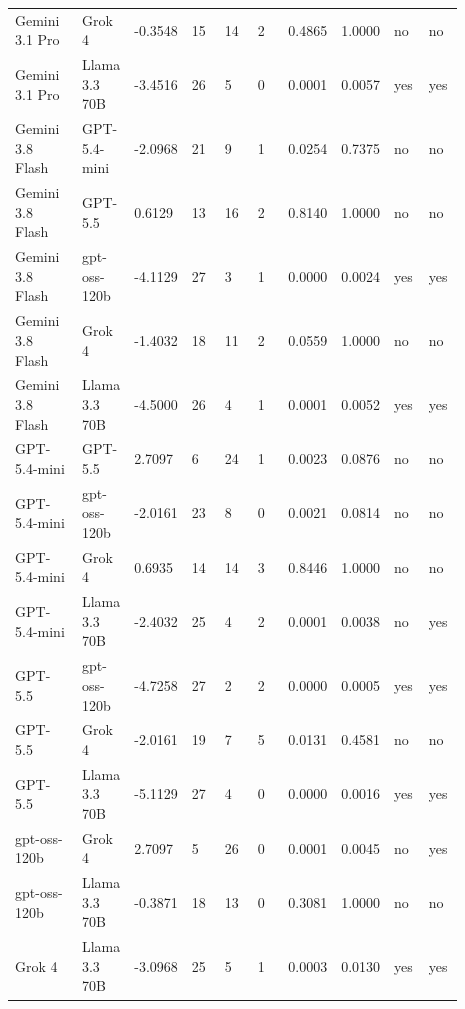 \begin{landscape}
\begin{longtable}{p{0.162\linewidth}p{0.081\linewidth}p{0.081\linewidth}p{0.081\linewidth}p{0.081\linewidth}p{0.081\linewidth}p{0.081\linewidth}p{0.081\linewidth}p{0.081\linewidth}p{0.081\linewidth}}
Gemini 3.1 Pro & Grok 4 & -0.3548 & 15 & 14 & 2 & 0.4865 & 1.0000 & no & no \\
Gemini 3.1 Pro & Llama 3.3 70B & -3.4516 & 26 & 5 & 0 & 0.0001 & 0.0057 & yes & yes \\
Gemini 3.8 Flash & GPT-5.4-mini & -2.0968 & 21 & 9 & 1 & 0.0254 & 0.7375 & no & no \\
Gemini 3.8 Flash & GPT-5.5 & 0.6129 & 13 & 16 & 2 & 0.8140 & 1.0000 & no & no \\
Gemini 3.8 Flash & gpt-oss-120b & -4.1129 & 27 & 3 & 1 & 0.0000 & 0.0024 & yes & yes \\
Gemini 3.8 Flash & Grok 4 & -1.4032 & 18 & 11 & 2 & 0.0559 & 1.0000 & no & no \\
Gemini 3.8 Flash & Llama 3.3 70B & -4.5000 & 26 & 4 & 1 & 0.0001 & 0.0052 & yes & yes \\
GPT-5.4-mini & GPT-5.5 & 2.7097 & 6 & 24 & 1 & 0.0023 & 0.0876 & no & no \\
GPT-5.4-mini & gpt-oss-120b & -2.0161 & 23 & 8 & 0 & 0.0021 & 0.0814 & no & no \\
GPT-5.4-mini & Grok 4 & 0.6935 & 14 & 14 & 3 & 0.8446 & 1.0000 & no & no \\
GPT-5.4-mini & Llama 3.3 70B & -2.4032 & 25 & 4 & 2 & 0.0001 & 0.0038 & no & yes \\
GPT-5.5 & gpt-oss-120b & -4.7258 & 27 & 2 & 2 & 0.0000 & 0.0005 & yes & yes \\
GPT-5.5 & Grok 4 & -2.0161 & 19 & 7 & 5 & 0.0131 & 0.4581 & no & no \\
GPT-5.5 & Llama 3.3 70B & -5.1129 & 27 & 4 & 0 & 0.0000 & 0.0016 & yes & yes \\
gpt-oss-120b & Grok 4 & 2.7097 & 5 & 26 & 0 & 0.0001 & 0.0045 & no & yes \\
gpt-oss-120b & Llama 3.3 70B & -0.3871 & 18 & 13 & 0 & 0.3081 & 1.0000 & no & no \\
Grok 4 & Llama 3.3 70B & -3.0968 & 25 & 5 & 1 & 0.0003 & 0.0130 & yes & yes \\
\bottomrule
\end{longtable}
\normalsize
\end{landscape}
